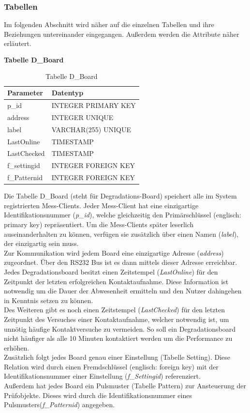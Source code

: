 \subsubsection{Tabellen}
Im folgenden Abschnitt wird näher auf die einzelnen Tabellen und ihre Beziehungen untereinander eingegangen. Außerdem werden die Attribute näher erläutert.


\textbf{Tabelle D\_Board}\\

\begin{table}[H]
\begin{center}
\begin{tabular}{|l|l|}\hline
Parameter & Datentyp \\ \hline
p\_id & INTEGER PRIMARY KEY\\ 
address & INTEGER UNIQUE\\ 
label & VARCHAR(255) UNIQUE\\ 
LastOnline & TIMESTAMP\\ 
LastChecked & TIMESTAMP\\ 
f\_settingid & INTEGER FOREIGN KEY\\
f\_Patternid & INTEGER FOREIGN KEY\\ \hline
\end{tabular}
\caption{Tabelle D\_Board}
\label{table_TabelleD_Board}
\end{center}
\end{table}


Die Tabelle D\_Board (steht für Degradations-Board) speichert alle im System registrierten Mess-Clients. Jeder Mess-Client hat eine einzigartige Identifikationsnummer (\textit{p\_id}), welche gleichzeitig den Primärschlüssel (englisch: primary key) repräsentiert. Um die Mess-Clients später leserlich auseinanderhalten zu können, verfügen sie zusätzlich über einen Namen (\textit{label}), der einzigartig sein muss.\\
Zur Kommunikation wird jedem Board eine einzigartige Adresse (\textit{address}) zugeordnet. Über den RS232 Bus ist es dann mittels dieser Adresse erreichbar.\\
Jedes Degradationsboard besitzt einen Zeitstempel (\textit{LastOnline}) für den Zeitpunkt der letzten erfolgreichen Kontaktaufnahme. Diese Information ist notwendig um die Dauer der Abwesenheit ermitteln und den Nutzer dahingehen in Kenntnis setzen zu können.\\
Des Weiteren gibt es noch einen Zeitstempel (\textit{LastChecked}) für den letzten Zeitpunkt des Versuches einer Kontaktaufnahme, welcher notwendig ist, um unnötig häufige Kontaktversuche zu vermeiden. So soll ein Degradationsboard nicht häufiger als alle 10 Minuten kontaktiert werden um die Performance zu erhöhen.\\
Zusätzlich folgt jedes Board genau einer Einstellung (Tabelle Setting). Diese Relation wird durch einen Fremdschlüssel (englisch: foreign key) mit der Identifikationsnummer einer Einstellung (\textit{f\_Settingid}) referenziert.\\
Außerdem hat jedes Board ein Pulsmuster (Tabelle Pattern) zur Ansteuerung der Prüfobjekte. Dieses wird durch die Identifikationsnummer eines Pulsmusters(\textit{f\_Patternid}) angegeben.


